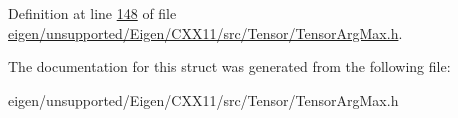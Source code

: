 Definition at line \hyperlink{eigen_2unsupported_2_eigen_2_c_x_x11_2src_2_tensor_2_tensor_arg_max_8h_source_l00148}{148} of file \hyperlink{eigen_2unsupported_2_eigen_2_c_x_x11_2src_2_tensor_2_tensor_arg_max_8h_source}{eigen/unsupported/\+Eigen/\+C\+X\+X11/src/\+Tensor/\+Tensor\+Arg\+Max.\+h}.



The documentation for this struct was generated from the following file\+:\begin{DoxyCompactItemize}
\item 
eigen/unsupported/\+Eigen/\+C\+X\+X11/src/\+Tensor/\+Tensor\+Arg\+Max.\+h\end{DoxyCompactItemize}
